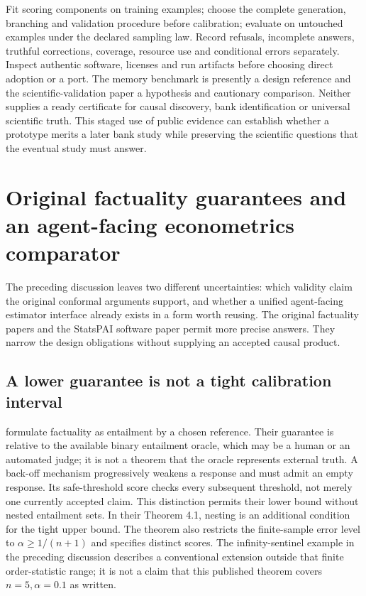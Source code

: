 Fit scoring components on training examples; choose the complete generation,
branching and validation procedure before calibration; evaluate on untouched
examples under the declared sampling law. Record refusals, incomplete answers,
truthful corrections, coverage, resource use and conditional errors separately.
Inspect authentic software, licenses and run artifacts before choosing direct
adoption or a port. The memory benchmark is presently a design reference and
the scientific-validation paper a hypothesis and cautionary comparison.
Neither supplies a ready certificate for causal discovery, bank identification
or universal scientific truth. This staged use of public evidence can establish
whether a prototype merits a later bank study while preserving the scientific
questions that the eventual study must answer.


\section{Original factuality guarantees and an agent-facing econometrics comparator}
\label{exec23:proof-scope}
The preceding discussion leaves two different uncertainties: which validity
claim the original conformal arguments support, and whether a unified
agent-facing estimator interface already exists in a form worth reusing.
The original factuality papers and the StatsPAI software paper permit more
precise answers. They narrow the design obligations without supplying an
accepted causal product.

\subsection{A lower guarantee is not a tight calibration interval}
\label{exec23:proof-lower}
\citet{exec23_mohri_factuality} formulate factuality as entailment by a chosen
reference. Their guarantee is relative to the available binary entailment
oracle, which may be a human or an automated judge; it is not a theorem that
the oracle represents external truth. A back-off mechanism progressively
weakens a response and must admit an empty response. Its safe-threshold
score checks every subsequent threshold, not merely one currently accepted
claim. This distinction permits their lower bound without nested entailment
sets. In their Theorem 4.1, nesting is an additional condition for the tight
upper bound. The theorem also restricts the finite-sample error level to
$\alpha\geq 1/(n+1)$ and specifies distinct scores. The infinity-sentinel
example in the preceding discussion describes a conventional extension
outside that finite order-statistic range; it is not a claim that this
published theorem covers $n=5,\alpha=0.1$ as written.


